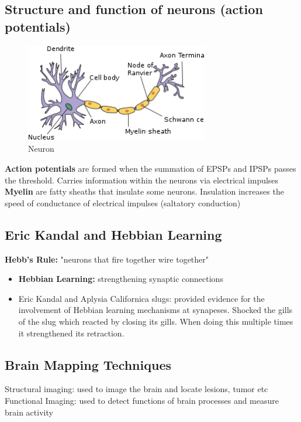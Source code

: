 \documentclass{article}
\begin{document}
\subsection{Structure and function of neurons (action potentials)}

\begin{figure}[htp]
\centering
\includegraphics[width=8cm]{images/neurons.png}
\caption{Neuron}
\label{fig:neuron}
\end{figure}

\textbf{Action potentials} are formed when the summation of EPSPs and IPSPs passes the threshold. Carries information within the neurons via electrical impulses \\

\textbf{Myelin} are fatty sheaths that insulate some neurons. Insulation increases the speed of conductance of electrical impulses (saltatory conduction) 

\subsection{Eric Kandal and Hebbian Learning}
\textbf{Hebb's Rule:} "neurons that fire together wire together" 

\begin{itemize}
    \item \textbf{Hebbian Learning:} strengthening synaptic connections
    \item Eric Kandal and Aplysia Californica slugs: provided evidence for the involvement of Hebbian learning mechanisms at synapeses. 
        \subitem Shocked the gills of the slug which reacted by closing its gills. When doing this multiple times it strengthened its retraction. 
\end{itemize}

\subsection{Brain Mapping Techniques}

Structural imaging: used to image the brain and locate lesions, tumor etc \\
\noindent Functional Imaging: used to detect functions of brain processes and measure brain activity \\
\end{document}
